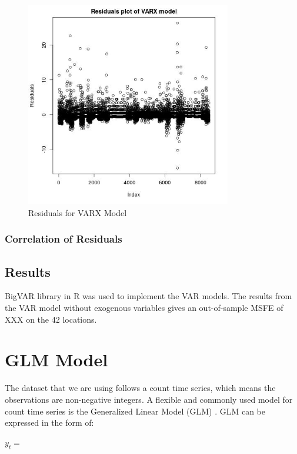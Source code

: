 \documentclass[10pt, letterpaper] {article}
\begin{document}
\begin{figure}[H]
    \centering
    \includegraphics[width=0.8\textwidth, height=0.4\textheight]{Images/VARX_resids.jpg}
    \caption{Residuals for VARX Model}
    \label{fig:Residuals for VARX Model}
\end{figure}

\subsubsection{Correlation of Residuals}


\subsection{Results}
BigVAR library in R was used to implement the VAR models. The results from the VAR model without exogenous variables gives an out-of-sample MSFE of XXX on the 42 locations. 


\section{GLM Model}
The dataset that we are using follows a count time series, which means the observations are non-negative integers. A flexible and commonly used model for count time series is the Generalized Linear Model (GLM) \cite{Nelder1972}. GLM can be expressed in the form of:

\begin{center}
    $\displaystyle y_t=$
\end{center}
\end{document}
